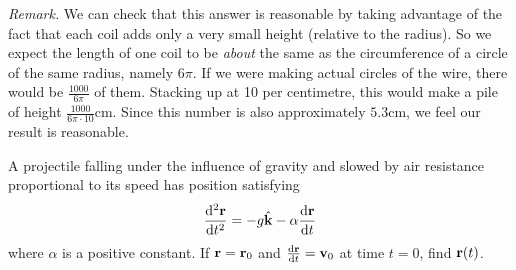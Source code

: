 \begin{solution}
\emph{Remark.} 
We can check that this answer is reasonable by taking advantage of the fact
that each coil adds only a very small height (relative to the radius).
So we expect the length of one coil to be \emph{about} the same as the circumference of a circle of the same radius, namely $6\pi$. 
If we were making actual circles of the wire, there would be $\frac{1000}{6\pi}$ of them. Stacking up at 10 per centimetre, 
this would make a pile of height $\frac{1000}{6\pi\cdot 10}$cm. Since this number is also approximately $5.3$cm, we feel our result is reasonable.
%



\end{solution}
\begin{question}
A projectile falling under the influence of gravity and slowed
by air resistance proportional to its speed has position satisfying
\begin{equation*}
\difftwo{\vr}{t}=-g\hk-\alpha\diff{\vr}{t}
\end{equation*}
where $\alpha$ is a positive constant. If $\mathbf{r}=\mathbf{r}_0$ and 
$\diff{\vr}{t}=\vv_0$ at time $t=0$, find $\mathbf{r}(t)$.
\end{question}

